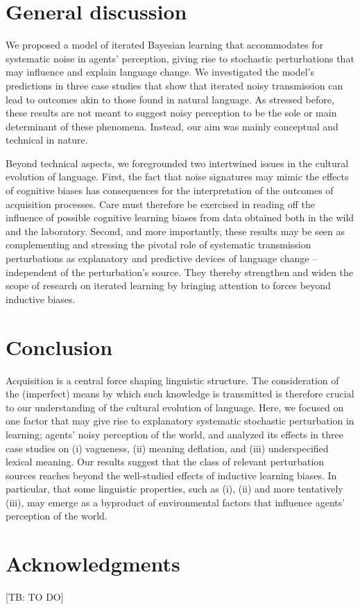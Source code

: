 \documentclass[10pt,a4paper]{article}
\newcommand{\tb}[1]{\textcolor[rgb]{.8,.33,.0}{[TB: #1]}}%
\begin{document}
\section{General discussion}
We proposed a model of iterated Bayesian learning that accommodates for systematic noise in agents' perception, giving rise to stochastic perturbations that may influence and explain language change. We investigated the model's predictions in three case studies that show that iterated noisy transmission can lead to outcomes akin to those found in natural language. As stressed before, these results are not meant to suggest noisy perception to be the sole or main determinant of these phenomena. Instead, our aim was mainly conceptual and technical in nature. 

Beyond technical aspects, we foregrounded two intertwined issues in the cultural evolution of language. First, the fact that noise signatures may mimic the effects of cognitive biases has consequences for the interpretation of the outcomes of acquisition processes. Care must therefore be exercised in reading off the influence of possible cognitive learning biases from data obtained both in the wild and the laboratory. Second, and more importantly, these results may be seen as complementing and stressing the pivotal role of systematic transmission perturbations as explanatory and predictive devices of language change -- independent of the perturbation's source. They thereby strengthen and widen the scope of research on iterated learning by bringing attention to forces beyond inductive biases. 


\section{Conclusion}
Acquisition is a central force shaping linguistic structure. The consideration of the (imperfect) means by which such knowledge is transmitted is therefore crucial to our understanding of the cultural evolution of language. Here, we focused on one factor that may give rise to explanatory systematic stochastic perturbation in learning; agents' noisy perception of the world, and analyzed its effects in three case studies on (i) vagueness, (ii) meaning deflation, and (iii) underspecified lexical meaning. Our results suggest that the class of relevant perturbation sources reaches beyond the well-studied effects of inductive learning biases. In particular, that some linguistic properties, such as (i), (ii) and more tentatively (iii), may emerge as a byproduct of environmental factors that influence agents' perception of the world. 


\section{Acknowledgments}
\tb{TO DO}




\setlength{\bibleftmargin}{.125in}
\setlength{\bibindent}{-\bibleftmargin}


\end{document}
